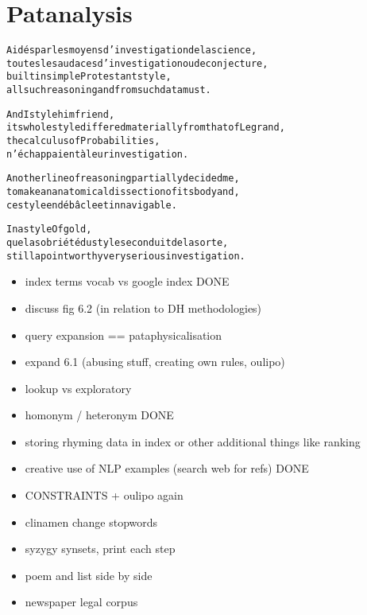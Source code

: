 
\chapter{Patanalysis}
\label{ch:analysis}

\startcontents[chapters]

\vfill

\begin{alltt}\sffamily
Aidés par les moyens d'investigation de la science,
toutes les audaces d'investigation ou de conjecture,
built in simple Protestant style,
all such reasoning and from such data must.

And I style him friend,
its whole style differed materially from that of Legrand,
the calculus of Probabilities,
n'échappaient à leur investigation.

Another line of reasoning partially decided me,
to make an anatomical dissection of its body and,
ce style en débâcle et innavigable.

In a style Of gold,
que la sobriété du style se conduit de la sorte,
still a point worthy very serious investigation.
\end{alltt}

\newpage
\minicontents
\spirals



\begin{itemize}
  \item index terms vocab vs google index DONE
  \item discuss fig 6.2 (in relation to DH methodologies)
  \item query expansion == pataphysicalisation
  \item expand 6.1 (abusing stuff, creating own rules, oulipo)
  \item lookup vs exploratory
  \item homonym / heteronym DONE
  \item storing rhyming data in index or other additional things like ranking
  \item creative use of NLP examples (search web for refs) DONE
  \item CONSTRAINTS + oulipo again
  \item clinamen change stopwords
  \item syzygy synsets, print each step
  \item poem and list side by side
  \item newspaper legal corpus
\end{itemize}

